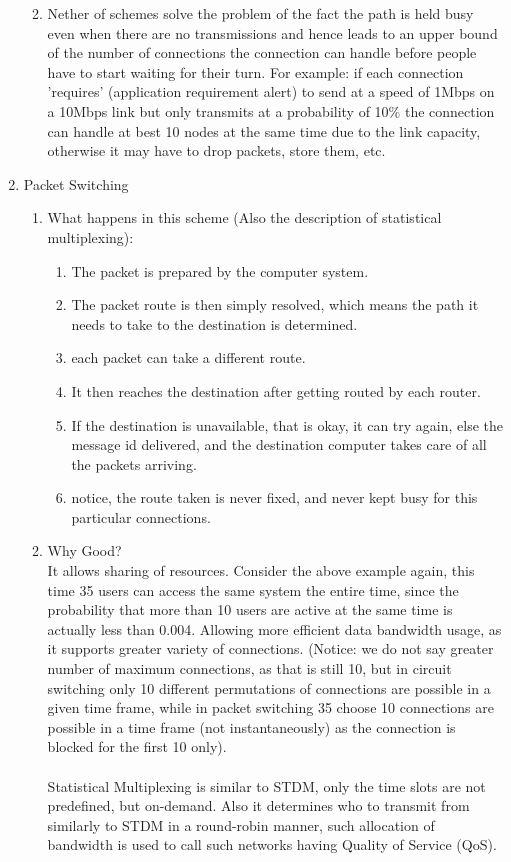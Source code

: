 \documentclass[11pt, a4paper]{article}
\begin{document}
\begin{enumerate}
\begin{enumerate}
\begin{enumerate}
            \end{enumerate}
            \item Nether of schemes solve the problem of the fact the path is held busy even when there are no transmissions and hence leads to an upper bound of the number of connections the connection can handle before people have to start waiting for their turn. For example: if each connection 'requires' (application requirement alert) to send at a speed of 1Mbps on a 10Mbps link but only transmits at a probability of 10\% the connection can handle at best 10 nodes at the same time due to the link capacity, otherwise it may have to drop packets, store them, etc.
    \end{enumerate}
    \item Packet Switching
    \begin{enumerate}
        \item What happens in this scheme (Also the description of statistical multiplexing):
        \begin{enumerate}
            \item The packet is prepared by the computer system.
            \item The packet route is then simply resolved, which means the path it needs to take to the destination is determined.
            \item each packet can take a different route.
            \item It then reaches the destination after getting routed by each router.
            \item If the destination is unavailable, that is okay, it can try again, else the message id delivered, and the destination computer takes care of all the packets arriving.
            \item notice, the route taken is never fixed, and never kept busy for this particular connections.
        \end{enumerate}
        \item Why Good?\\
        It allows sharing of resources. Consider the above example again, this time 35 users can access the same system the entire time, since the probability that more than 10 users are active at the same time is actually less than 0.004. Allowing more efficient data bandwidth usage, as it supports greater variety of connections. (Notice: we do not say greater number of maximum connections, as that is still 10, but in circuit switching only 10 different permutations of connections are possible in a given time frame, while in packet switching 35 choose 10 connections are possible in a time frame (not instantaneously) as the connection is blocked for the first 10 only).\\\\
        Statistical Multiplexing is similar to STDM, only the time slots are not predefined, but on-demand. Also it determines who to transmit from similarly to STDM in a round-robin manner, such allocation of bandwidth is used to call such networks having Quality of Service (QoS).
    \end{enumerate}
\end{enumerate}
\end{document}
